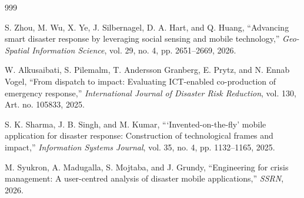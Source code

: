 \documentclass[a4paper,12pt]{report}
\begin{document}
	\begin{thebibliography}{999}
		
		
		S. Zhou, M. Wu, X. Ye, J. Silbernagel, D. A. Hart, and Q. Huang, ``Advancing smart disaster response by leveraging social sensing and mobile technology,'' \textit{Geo-Spatial Information Science}, vol. 29, no. 4, pp. 2651--2669, 2026.
		
		W. Alkusaibati, S. Pilemalm, T. Andersson Granberg, E. Prytz, and N. Ennab Vogel, ``From dispatch to impact: Evaluating ICT-enabled co-production of emergency response,'' \textit{International Journal of Disaster Risk Reduction}, vol. 130, Art. no. 105833, 2025.
		
		S. K. Sharma, J. B. Singh, and M. Kumar, ```Invented-on-the-fly' mobile application for disaster response: Construction of technological frames and impact,'' \textit{Information Systems Journal}, vol. 35, no. 4, pp. 1132--1165, 2025.
		
		M. Syukron, A. Madugalla, S. Mojtaba, and J. Grundy, ``Engineering for crisis management: A user-centred analysis of disaster mobile applications,'' \textit{SSRN}, 2026.
		
	\end{thebibliography}
	
\end{document}
